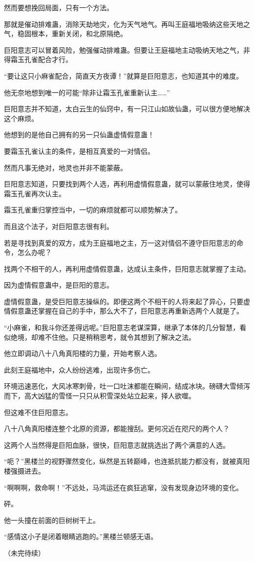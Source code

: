 \begin{this_body}
然而要想挽回局面，只有一个方法。

那就是催动排难蛊，消除天劫地灾，化为天气地气。再叫王庭福地吸纳这些天地之气，稳固根本，重新关闭，和北原隔绝。

巨阳意志可以冒着风险，勉强催动排难蛊。但要让王庭福地主动吸纳天地之气，非得霜玉孔雀配合才行。

“要让这只小麻雀配合，简直天方夜谭！”就算是巨阳意志，也知道其中的难度。

他无奈地想到唯一的可能“除非让霜玉孔雀重新认主……”

巨阳意志并不知道，太白云生的仙窍中，有一只江山如故仙蛊，可以很方便地解决这个麻烦。

他想到的是他自己拥有的另一只仙蛊虚情假意蛊！

要霜玉孔雀认主的条件，是相互真爱的一对情侣。

然而凡事无绝对，地灵也并非不能蒙蔽。

巨阳意志知道，只要找到两个人选，再利用虚情假意蛊，就可以蒙蔽住地灵，使得霜玉孔雀再次认主。

霜玉孔雀重归掌控当中，一切的麻烦就都可以顺势解决了。

而且这个法子，对巨阳意志很有利。

若是寻找到真爱的双方，成为王庭福地之主，万一这对情侣不遵守巨阳意志的命令，怎么办呢？

找两个不相干的人，再利用虚情假意蛊，达成认主条件，巨阳意志就掌握了主动。

因为虚情假意蛊中，是巨阳的意志。

虚情假意蛊，是受巨阳意志操纵的。即便这两个不相干的人将来起了异心，只要虚情假意蛊还掌握在自己的手中，那么大不了，巨阳意志再重新选两个人就是了。

“小麻雀，和我斗你还差得远呢。”巨阳意志老谋深算，继承了本体的几分智慧，看似绝境，却难不住他。只是稍稍思考，就令其想到了解决之法。

他立即调动八十八角真阳楼的力量，开始考察人选。

此刻王庭福地中，众人纷纷逃难，出现许多伤亡。

环境迅速恶化，大风冰寒刺骨，吐一口吐沫都能在瞬间，结成冰块。磅礴大雪倾泻而下，高大凶猛的雪怪一只只从积雪深处站立起来，择人欲噬。

但这难不住巨阳意志。

八十八角真阳楼连整个北原的资源，都能搜刮。更何况近在咫尺的两个人？

这两个人当然得是巨阳血脉，很快，巨阳意志就挑选出了两个满意的人选。

“呃？”黑楼兰的视野骤然变化，纵然是五转巅峰，也连抵抗能力都没有，就被真阳楼强摄进去。

“啊啊啊，救命啊！”不远处，马鸿运还在疯狂逃窜，没有发现身边环境的变化。

砰。

他一头撞在前面的巨树树干上。

“感情这小子是闭着眼睛逃跑的。”黑楼兰顿感无语。

（未完待续）

\end{this_body}

